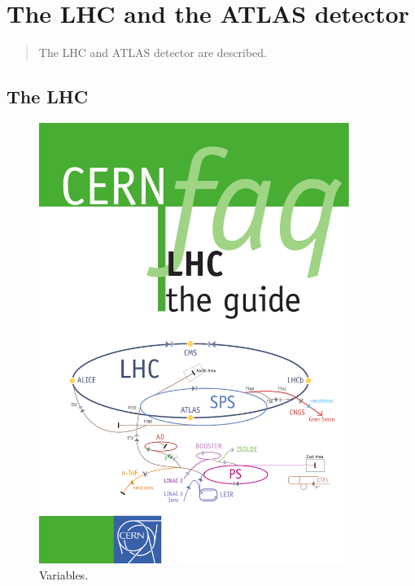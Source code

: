 \chapter[experiment][experiment]{The LHC and the ATLAS detector}

 \begin{quote}
   The LHC and ATLAS detector are described.
 \end{quote}
 
 \section{The LHC}
 \label{sec:lhc}

\begin{figure}[tp]
  \centering
  \includegraphics[width=0.90\textwidth]{figures/lhc-atlas/lhc-accelerator-complex}
  \caption{Variables.}
  \label{fig:lhc-complex}
\end{figure}


